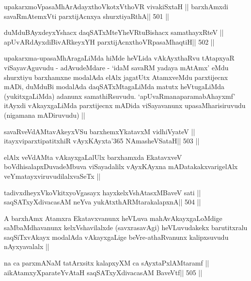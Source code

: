 
 
\begin{shl}
upakarxmoVpasaMhArAdayxthoVkotxV\s thoVR vivakiSxtaH ||
barxhAmxdi savaRmAtemxVti parxtijAcnxya shurxtiyaRthA\hfill || 501 ||
\end{shl}

\begin{shl}
duMduBAyxdeyxYshacx daqSATxMteYheVRtuBishacx samathayxRteV ||
apUvARdAyxdiBivARkeyxYH parxtijAcnxthoVRpasaMhaqtiH\hfill || 502 ||
\end{shl}

\begin{artha}
upakarxma-upasaMhAragaLiMda hiMde heVLida vAkAyxthaRvu tAtapxyaR
viSayavAguvudu - adAvudeMdare - `idaM savaRM yadaya mAtAmx' eMdu
shurxtiyu barxhamxne modalAda elAlx jagatUtx AtamxveMdu parxtijecnx
mADi, duMduBi modalAda daqSATxMtagaLiMda matutx heVtugaLiMda
(yukitxgaLiMda) adanunx samathiRsuvudu. `apUvaRmanaparamabAhayxmf'
itAyxdi vAkayxgaLiMda parxtijecnx mADida viSayavanunx
upasaMharisiruvudu (nigamana mADiruvudu) ||
\end{artha}

\begin{shl}
savaRveVdAMtavAkeyxVSu barxhemxYkatavxM vidhiVyateV ||
itayxviparxtipatitxhiR vAyxKAyxta\char'365 NAmasheVSataH\hfill || 503 ||
\end{shl}

\begin{artha}
elAlx veVdAMta vAkayxgaLalUlx barxhamxda EkatavxveV
boVdhisalapxDuvadeMbuva viSayadalilx vAyxKAyxna mADatakakxvarigelAlx
veYmatayxviruvudilalxvaSeTx ||
\end{artha}

\begin{shl}
tadivxdheyxVkoVkitxyoVgasayx hayxkelxVshAtasxMBaveV sati ||
saqSATxyXdivacasAM neYva yukAtx\s thARMtarakalapxnA\hfill || 504 ||
\end{shl}

\begin{artha}
A barxhAmx Atamxra Ekatavxvanunx heVLuva mahAvAkayxgaLoMdige
saMbaMdhavanunx kelxVshavilalxde (savxrasavAgi) heVLuvudakekx
barutitxralu saqSiTxvAkayx modalAda vAkayxgaLige beVre-athaRvanunx
kalipxsuvudu nAyxyavalalx ||
\end{artha}

\begin{shl}
na ca parxmANaM tatArxsitx kalapxyXM ca sAyxtaPxlAMtaramf ||
aikAtamxyXparateYvAtaH saqSATxyXdivacasAM BaveVtf\hfill || 505 ||
\end{shl}

